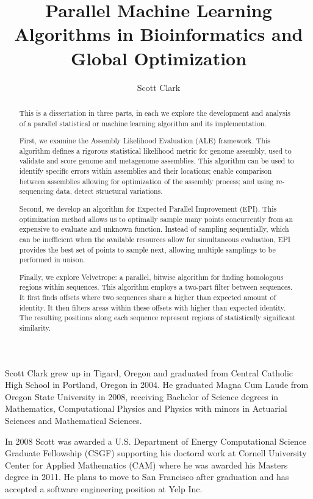 \documentclass[phd,tocprelim]{cornell}
\title {Parallel Machine Learning Algorithms in Bioinformatics and Global Optimization}
\author {Scott Clark}
\begin{document}
\maketitle
\makecopyright

\begin{abstract}
This is a dissertation in three parts, in each we explore the development and analysis of a parallel statistical or machine learning algorithm and its implementation.

First, we examine the Assembly Likelihood Evaluation (ALE) framework. This algorithm defines a rigorous statistical likelihood metric for genome assembly, used to validate and score genome and metagenome assemblies. This algorithm can be used to identify specific errors within assemblies and their locations; enable comparison between assemblies allowing for optimization of the assembly process; and using re-sequencing data, detect structural variations.

Second, we develop an algorithm for Expected Parallel Improvement (EPI). This optimization method allows us to optimally sample many points concurrently from an expensive to evaluate and unknown function. Instead of sampling sequentially, which can be inefficient when the available resources allow for simultaneous evaluation, EPI provides the best set of points to sample next, allowing multiple samplings to be performed in unison.

Finally, we explore Velvetrope: a parallel, bitwise algorithm for finding homologous regions within sequences. This algorithm employs a two-part filter between sequences. It first finds offsets where two sequences share a higher than expected amount of identity. It then filters areas within these offsets with higher than expected identity. The resulting positions along each sequence represent regions of statistically significant similarity.
\end{abstract}

\begin{biosketch}
Scott Clark grew up in Tigard, Oregon and graduated from Central Catholic High School in Portland, Oregon in 2004. He graduated Magna Cum Laude from Oregon State University in 2008, receiving Bachelor of Science degrees in Mathematics, Computational Physics and Physics with minors in Actuarial Sciences and Mathematical Sciences.

In 2008 Scott was awarded a U.S. Department of Energy Computational Science Graduate Fellowship (CSGF) supporting his doctoral work at Cornell University Center for Applied Mathematics (CAM) where he was awarded his Masters degree in 2011. He plans to move to San Francisco after graduation and has accepted a software engineering position at Yelp Inc.
\end{biosketch}
\end{document}
